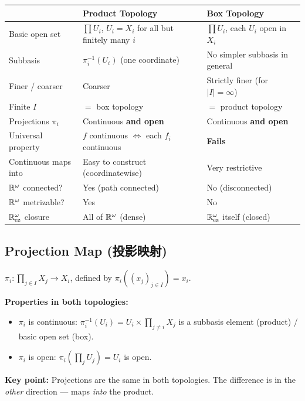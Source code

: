 \documentclass{article}
\begin{document}
\begin{center}
  \begin{tabular}{@{}p{3.5cm}p{5.5cm}p{5.5cm}@{}}
    \hline
    & \textbf{Product Topology} & \textbf{Box Topology} \\
    \hline
    Basic open set & $\prod U_i$, $U_i = X_i$ for all but finitely many $i$ &
    $\prod U_i$, each $U_i$ open in $X_i$ \\[4pt]
    Subbasis & $\pi_i^{-1}(U_i)$ (one coordinate) &
    No simpler subbasis in general \\[4pt]
    Finer / coarser & Coarser & Strictly finer (for $|I| = \infty$) \\[4pt]
    Finite $I$ & $=$ box topology & $=$ product topology \\[4pt]
    Projections $\pi_i$ & Continuous \textbf{and open} & Continuous
    \textbf{and open} \\[4pt]
    Universal property & $f$ continuous $\iff$ each $f_i$ continuous &
    \textbf{Fails} \\[4pt]
    Continuous maps into & Easy to construct (coordinatewise) & Very
    restrictive \\[4pt]
    $\mathbb{R}^\omega$ connected? & Yes (path connected) & No (disconnected) \\
    $\mathbb{R}^\omega$ metrizable? & Yes & No \\
    $\mathbb{R}^\omega_{\mathrm{ez}}$ closure & All of $\mathbb{R}^\omega$ (dense) &
    $\mathbb{R}^\omega_{\mathrm{ez}}$ itself (closed) \\
    \hline
  \end{tabular}
\end{center}

\subsection{Projection Map (投影映射)}\label{def:projection}
$\pi_i : \prod_{j \in I} X_j \to X_i$, defined by $\pi_i((x_j)_{j \in
I}) = x_i$.

\textbf{Properties in both topologies:}
\begin{itemize}
  \item $\pi_i$ is continuous: $\pi_i^{-1}(U_i) = U_i \times \prod_{j
    \ne i} X_j$ is a subbasis element (product) / basic open set (box).
  \item $\pi_i$ is open: $\pi_i(\prod_j U_j) = U_i$ is open.
\end{itemize}

\textbf{Key point:} Projections are the same in both topologies. The
difference is in the \emph{other} direction --- maps \emph{into} the
product.
\end{document}
